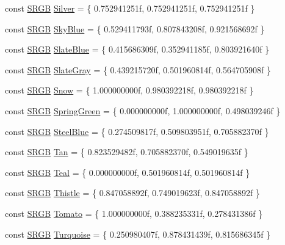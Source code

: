 \begin{DoxyCompactItemize}
const \hyperlink{structmage_1_1_s_r_g_b}{S\+R\+GB} \hyperlink{namespacemage_1_1color_aa35ea9998a648b6577401868083e6e80}{Silver} = \{ 0.\+752941251f, 0.\+752941251f, 0.\+752941251f \}
\item 
const \hyperlink{structmage_1_1_s_r_g_b}{S\+R\+GB} \hyperlink{namespacemage_1_1color_a4c554165ede328affff8cafd97a59d14}{Sky\+Blue} = \{ 0.\+529411793f, 0.\+807843208f, 0.\+921568692f \}
\item 
const \hyperlink{structmage_1_1_s_r_g_b}{S\+R\+GB} \hyperlink{namespacemage_1_1color_a2bff1d57080a8c8bf0e91d527cd8b7fc}{Slate\+Blue} = \{ 0.\+415686309f, 0.\+352941185f, 0.\+803921640f \}
\item 
const \hyperlink{structmage_1_1_s_r_g_b}{S\+R\+GB} \hyperlink{namespacemage_1_1color_aabbc96be90fc5f063070661402f7d543}{Slate\+Gray} = \{ 0.\+439215720f, 0.\+501960814f, 0.\+564705908f \}
\item 
const \hyperlink{structmage_1_1_s_r_g_b}{S\+R\+GB} \hyperlink{namespacemage_1_1color_aeeb0f5613c8d9f1f8d6cb9b618b81536}{Snow} = \{ 1.\+000000000f, 0.\+980392218f, 0.\+980392218f \}
\item 
const \hyperlink{structmage_1_1_s_r_g_b}{S\+R\+GB} \hyperlink{namespacemage_1_1color_ade7b2c7df029ca970a08a753184303a3}{Spring\+Green} = \{ 0.\+000000000f, 1.\+000000000f, 0.\+498039246f \}
\item 
const \hyperlink{structmage_1_1_s_r_g_b}{S\+R\+GB} \hyperlink{namespacemage_1_1color_a09d674790af6985e060392d528e3771d}{Steel\+Blue} = \{ 0.\+274509817f, 0.\+509803951f, 0.\+705882370f \}
\item 
const \hyperlink{structmage_1_1_s_r_g_b}{S\+R\+GB} \hyperlink{namespacemage_1_1color_a40a0a3dbf5b5ac7ac3c8076421be4d24}{Tan} = \{ 0.\+823529482f, 0.\+705882370f, 0.\+549019635f \}
\item 
const \hyperlink{structmage_1_1_s_r_g_b}{S\+R\+GB} \hyperlink{namespacemage_1_1color_af0c217891f8246831303f03225363442}{Teal} = \{ 0.\+000000000f, 0.\+501960814f, 0.\+501960814f \}
\item 
const \hyperlink{structmage_1_1_s_r_g_b}{S\+R\+GB} \hyperlink{namespacemage_1_1color_a289ed514f534f753649634853d8645bb}{Thistle} = \{ 0.\+847058892f, 0.\+749019623f, 0.\+847058892f \}
\item 
const \hyperlink{structmage_1_1_s_r_g_b}{S\+R\+GB} \hyperlink{namespacemage_1_1color_aee8bb388f326f18533838abdb2ac2b51}{Tomato} = \{ 1.\+000000000f, 0.\+388235331f, 0.\+278431386f \}
\item 
const \hyperlink{structmage_1_1_s_r_g_b}{S\+R\+GB} \hyperlink{namespacemage_1_1color_a075d778d7eabdd7d54b623e6a7254fc8}{Turquoise} = \{ 0.\+250980407f, 0.\+878431439f, 0.\+815686345f \}

\end{DoxyCompactItemize}
